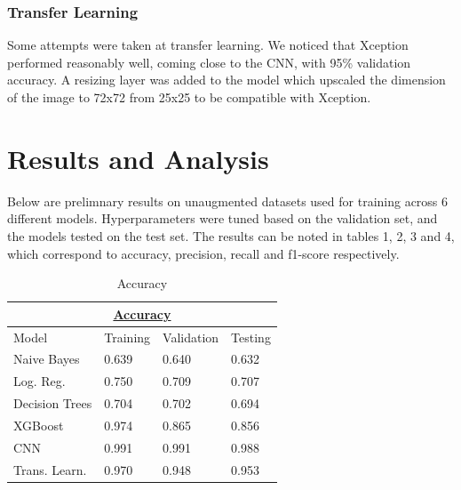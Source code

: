 \documentclass[10pt,twocolumn,letterpaper]{article}
\begin{document}
\subsubsection{Transfer Learning}
Some attempts were taken at transfer learning. We noticed that Xception performed reasonably well, coming close to the CNN, with 95\% validation accuracy. A resizing layer was added to the model which upscaled the dimension of the image to 72x72 from 25x25 to be compatible with Xception.

\section{Results and Analysis}

Below are prelimnary results on unaugmented datasets used for training across 6 different models. Hyperparameters were tuned based on the validation set, and the models tested on the test set. The results can be noted in tables 1, 2, 3 and 4, which correspond to accuracy, precision, recall and f1-score respectively. 


\begin{table}[]
   \begin{tabular}{|llll|}
   \hline
   \multicolumn{4}{|c|}{{\ul \textbf{Accuracy}}}                                                                                  \\ \hline
   \multicolumn{1}{|l|}{Model}                        & \multicolumn{1}{l|}{Training} & \multicolumn{1}{l|}{Validation} & Testing \\ \hline
   \multicolumn{1}{|l|}{Naive Bayes}                  & \multicolumn{1}{l|}{0.639}    & \multicolumn{1}{l|}{0.640}      & 0.632   \\ \hline
   \multicolumn{1}{|l|}{Log. Reg.}          & \multicolumn{1}{l|}{0.750}    & \multicolumn{1}{l|}{0.709}      & 0.707   \\ \hline
   \multicolumn{1}{|l|}{Decision Trees}               & \multicolumn{1}{l|}{0.704}    & \multicolumn{1}{l|}{0.702}      & 0.694   \\ \hline
   \multicolumn{1}{|l|}{XGBoost}                      & \multicolumn{1}{l|}{0.974}    & \multicolumn{1}{l|}{0.865}      & 0.856   \\ \hline
   \multicolumn{1}{|l|}{CNN}                          & \multicolumn{1}{l|}{0.991}    & \multicolumn{1}{l|}{0.991}      & 0.988   \\ \hline
   \multicolumn{1}{|l|}{Trans. Learn.} & \multicolumn{1}{l|}{0.970}    & \multicolumn{1}{l|}{0.948}      & 0.953   \\ \hline
   \end{tabular}

   \caption{Accuracy}
\end{table}
\end{document}
